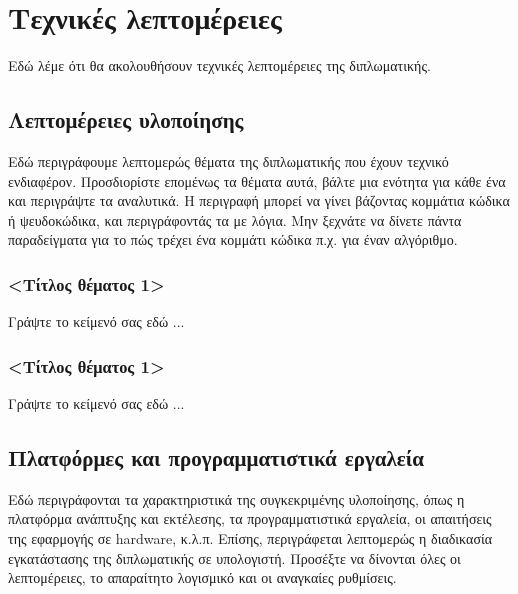 \chapter{Τεχνικές λεπτομέρειες}
\label{chap7}

Εδώ λέμε ότι θα ακολουθήσουν τεχνικές λεπτομέρειες της διπλωματικής.

\section{Λεπτομέρειες υλοποίησης}

Εδώ περιγράφουμε λεπτομερώς θέματα της διπλωματικής που έχουν τεχνικό ενδιαφέρον. Προσδιορίστε επομένως τα θέματα αυτά, βάλτε μια ενότητα για κάθε ένα και περιγράψτε τα αναλυτικά. Η περιγραφή μπορεί να γίνει βάζοντας κομμάτια κώδικα ή ψευδοκώδικα, και περιγράφοντάς τα με λόγια. Μην ξεχνάτε να δίνετε πάντα παραδείγματα για το πώς τρέχει ένα κομμάτι κώδικα π.χ. για έναν αλγόριθμο.

\subsection{<Τίτλος θέματος 1>}
Γράψτε το κείμενό σας εδώ ...

\subsection{<Τίτλος θέματος 1>}
Γράψτε το κείμενό σας εδώ ...

\section{Πλατφόρμες και προγραμματιστικά εργαλεία}

Εδώ περιγράφονται τα χαρακτηριστικά της συγκεκριμένης υλοποίησης, όπως η πλατφόρμα ανάπτυξης και εκτέλεσης, τα προγραμματιστικά εργαλεία, οι απαιτήσεις της εφαρμογής σε hardware, κ.λ.π. Επίσης, περιγράφεται λεπτομερώς η διαδικασία εγκατάστασης της διπλωματικής σε υπολογιστή. Προσέξτε να δίνονται όλες οι λεπτομέρειες, το απαραίτητο λογισμικό και οι αναγκαίες ρυθμίσεις.
